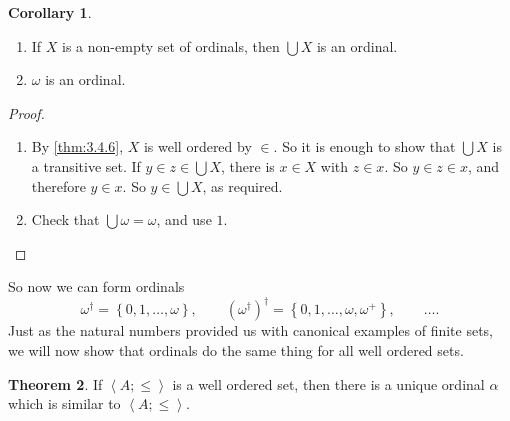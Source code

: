\documentclass{article}
\newcommand{\rb}[1]{\left( #1 \right)}
\newcommand{\cb}[1]{\left\{ #1 \right\}}
\newcommand{\ab}[1]{\left\langle #1 \right\rangle}
\theoremstyle{definition}\newtheorem{definition}{Definition}[subsection]
\theoremstyle{definition}\newtheorem{remark1}[definition]{Remark}
\theoremstyle{definition}\newtheorem{example1}[definition]{Example}
\theoremstyle{definition}\newtheorem*{remark2}{Remark}
\theoremstyle{definition}\newtheorem*{example2}{Example}
\theoremstyle{definition}\newtheorem*{note}{Note}
\theoremstyle{definition}\newtheorem*{notation}{Notation}
\newtheorem{theorem}[definition]{Theorem}
\newtheorem{corollary}[definition]{Corollary}
\begin{document}
\begin{corollary}
\label{cor:3.4.7}
\hfill
\begin{enumerate}
\item If $ X $ is a non-empty set of ordinals, then $ \bigcup X $ is an ordinal.
\item $ \omega $ is an ordinal.
\end{enumerate}
\end{corollary}

\begin{proof}
\hfill
\begin{enumerate}
\item By \ref{thm:3.4.6}, $ X $ is well ordered by $ \in $. So it is enough to show that $ \bigcup X $ is a transitive set. If $ y \in z \in \bigcup X $, there is $ x \in X $ with $ z \in x $. So $ y \in z \in x $, and therefore $ y \in x $. So $ y \in \bigcup X $, as required.
\item Check that $ \bigcup \omega = \omega $, and use $ 1 $.
\end{enumerate}
\end{proof}

\pagebreak

So now we can form ordinals
$$ \omega^\dagger = \cb{0, 1, \dots, \omega}, \qquad \rb{\omega^\dagger}^\dagger = \cb{0, 1, \dots, \omega, \omega^+}, \qquad \dots. $$
Just as the natural numbers provided us with canonical examples of finite sets, we will now show that ordinals do the same thing for all well ordered sets.

\begin{theorem}
\label{thm:3.4.8}
If $ \ab{A; \le} $ is a well ordered set, then there is a unique ordinal $ \alpha $ which is similar to $ \ab{A; \le} $.
\end{theorem}
\end{document}
